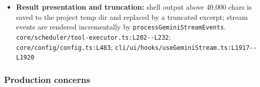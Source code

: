 \begin{itemize}
\item \textbf{Result presentation and truncation:} shell output above 40,000 chars is saved to the project temp dir and replaced by a truncated excerpt; stream events are rendered incrementally by \texttt{processGeminiStreamEvents}. \texttt{core/\allowbreak{}scheduler/\allowbreak{}tool-\allowbreak{}executor.\allowbreak{}ts:\allowbreak{}L202-\allowbreak{}-\allowbreak{}L232}; \texttt{core/\allowbreak{}config/\allowbreak{}config.\allowbreak{}ts:\allowbreak{}L483}; \texttt{cli/\allowbreak{}ui/\allowbreak{}hooks/\allowbreak{}useGeminiStream.\allowbreak{}ts:\allowbreak{}L1917-\allowbreak{}-\allowbreak{}L1920}
\end{itemize}

\subsubsection*{Production concerns}
